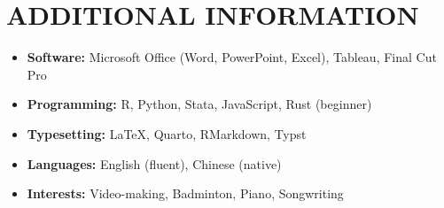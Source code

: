 \documentclass[a4paper,9pt]{extarticle}
\begin{document}
\section*{ADDITIONAL INFORMATION}
\begin{itemize}
    \item \textbf{Software:} Microsoft Office (Word, PowerPoint, Excel), Tableau, Final Cut Pro
    \item \textbf{Programming:} R, Python, Stata, JavaScript, Rust (beginner)
    \item \textbf{Typesetting:} \LaTeX, Quarto, RMarkdown, Typst
    \item \textbf{Languages:} English (fluent), Chinese (native)
    \item \textbf{Interests:} Video-making, Badminton, Piano, Songwriting
\end{itemize}

\end{document}
